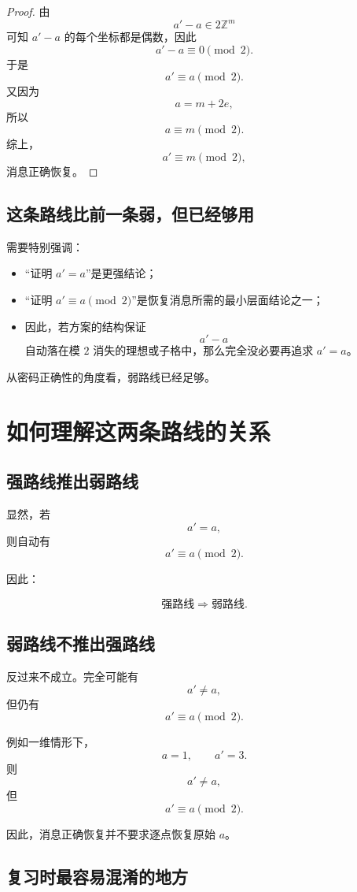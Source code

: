 \documentclass[12pt,a4paper]{article}
\begin{document}
\begin{proof}
由
\[
a'-a \in 2\mathbb Z^m
\]
可知 \(a'-a\) 的每个坐标都是偶数，因此
\[
a'-a \equiv 0 \pmod 2.
\]
于是
\[
a' \equiv a \pmod 2.
\]
又因为
\[
a = m+2e,
\]
所以
\[
a \equiv m \pmod 2.
\]
综上，
\[
a' \equiv m \pmod 2,
\]
消息正确恢复。
\end{proof}

\subsection{这条路线比前一条弱，但已经够用}

需要特别强调：

\begin{itemize}[leftmargin=2em]
    \item “证明 \(a'=a\)”是更强结论；
    \item “证明 \(a'\equiv a\pmod 2\)”是恢复消息所需的最小层面结论之一；
    \item 因此，若方案的结构保证
    \[
    a'-a
    \]
    自动落在模 \(2\) 消失的理想或子格中，那么完全没必要再追求 \(a'=a\)。
\end{itemize}

从密码正确性的角度看，弱路线已经足够。

\section{如何理解这两条路线的关系}

\subsection{强路线推出弱路线}

显然，若
\[
a'=a,
\]
则自动有
\[
a'\equiv a \pmod 2.
\]

因此：

\[
\text{强路线} \Longrightarrow \text{弱路线}.
\]

\subsection{弱路线不推出强路线}

反过来不成立。完全可能有
\[
a' \neq a,
\]
但仍有
\[
a' \equiv a \pmod 2.
\]

例如一维情形下，
\[
a=1,\qquad a'=3.
\]
则
\[
a'\neq a,
\]
但
\[
a' \equiv a \pmod 2.
\]

因此，消息正确恢复并不要求逐点恢复原始 \(a\)。

\subsection{复习时最容易混淆的地方}
\end{document}
